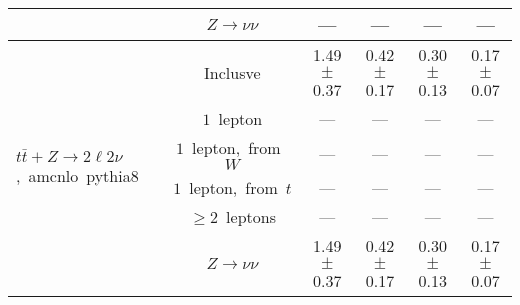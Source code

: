 \documentclass{article}
\begin{document}
\begin{longtable}{|l|c|c|c|c|c|}
 & $Z\rightarrow\nu\nu$  & ---  & ---  & ---  & --- \\* 
\hline 
\multirow{6}{*}{$t\bar{t}+Z{\rightarrow}2{\ell}2{\nu}$,~amcnlo~pythia8} & Inclusve  & 1.49 $\pm$ 0.37  & 0.42 $\pm$ 0.17  & 0.30 $\pm$ 0.13  & 0.17 $\pm$ 0.07 \\* 
 & $1$~lepton  & ---  & ---  & ---  & --- \\* 
 & $1$~lepton,~from~$W$  & ---  & ---  & ---  & --- \\* 
 & $1$~lepton,~from~$t$  & ---  & ---  & ---  & --- \\* 
 & $\ge2$~leptons  & ---  & ---  & ---  & --- \\* 
 & $Z\rightarrow\nu\nu$  & 1.49 $\pm$ 0.37  & 0.42 $\pm$ 0.17  & 0.30 $\pm$ 0.13  & 0.17 $\pm$ 0.07 \\* 
\hline 
\end{longtable} 

 
 
 
 
\pagebreak 

 
 
 
 
\end{document}
